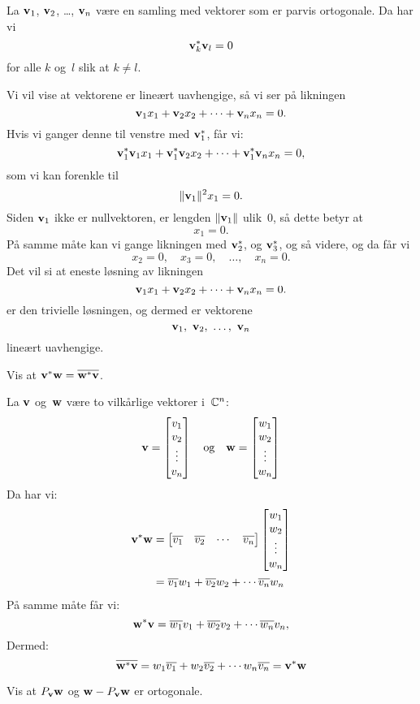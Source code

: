 \begin{losning}
La $\mathbf{v}_1$, $\mathbf{v}_2$, \ldots, $\mathbf{v}_n$ være en samling med vektorer som er
parvis ortogonale.  Da har vi
\[
\mathbf{v}_k^* \mathbf{v}_l = 0
\]
for alle $k$ og~$l$ slik at $k \ne l$.

Vi vil vise at vektorene er lineært uavhengige, så vi ser på likningen
\[
\mathbf{v}_1 x_1 + \mathbf{v}_2 x_2 + \cdots + \mathbf{v}_n x_n = 0.
\]
Hvis vi ganger denne til venstre med $\mathbf{v}_1^*$, får vi:
\[
\mathbf{v}_1^* \mathbf{v}_1 x_1 + \mathbf{v}_1^* \mathbf{v}_2 x_2 + \cdots + \mathbf{v}_1^* \mathbf{v}_n x_n = 0,
\]
som vi kan forenkle til
\[
\|\mathbf{v}_1\|^2 x_1 = 0.
\]
Siden $\mathbf{v}_1$ ikke er nullvektoren, er lengden $\|\mathbf{v}_1\|$ ulik~$0$, så
dette betyr at
\[
x_1 = 0.
\]
På samme måte kan vi gange likningen med $\mathbf{v}_2^*$, og $\mathbf{v}_3^*$, og så
videre, og da får vi
\[
x_2 = 0,\quad
x_3 = 0,\quad\ldots,\quad
x_n = 0.
\]
Det vil si at eneste løsning av likningen
\[
\mathbf{v}_1 x_1 + \mathbf{v}_2 x_2 + \cdots + \mathbf{v}_n x_n = 0.
\]
er den trivielle løsningen, og dermed er vektorene
\[
\v_1,\ \v_2,\ \ldots,\ \v_n
\]
lineært uavhengige.
\end{losning}


\begin{oppgave}
Vis at $\mathbf{v}^* \mathbf{w}=\overline{\mathbf{w}^* \mathbf{v}}$.
\end{oppgave}


\begin{losning}
La $\mathbf{v}$ og~$\mathbf{w}$ være to vilkårlige vektorer i~$\mathbb{C}^n$:
\[
\mathbf{v} = \begin{bmatrix} v_1 \\ v_2 \\ \vdots \\ v_n \end{bmatrix}
\quad\text{og}\quad
\mathbf{w} = \begin{bmatrix} w_1 \\ w_2 \\ \vdots \\ w_n \end{bmatrix}
\]
Da har vi:
\begin{align*}
\mathbf{v}^* \mathbf{w}
&=
\begin{bmatrix} \overline{v_1} & \overline{v_2} & \cdots & \overline{v_n} \end{bmatrix}
\begin{bmatrix} w_1 \\ w_2 \\ \vdots \\ w_n \end{bmatrix}
\\
&=
\overline{v_1} w_1 + 
\overline{v_2} w_2 + 
\cdots
\overline{v_n} w_n
\end{align*}
På samme måte får vi:
\[
\mathbf{w}^* \mathbf{v} =
\overline{w_1} v_1 + 
\overline{w_2} v_2 + 
\cdots
\overline{w_n} v_n,
\]
Dermed:
\[
\overline{\mathbf{w}^* \mathbf{v}} =
w_1 \overline{v_1} + 
w_2 \overline{v_2} + 
\cdots
w_n \overline{v_n}
= \mathbf{v}^* \mathbf{w}
\]
\end{losning}


\begin{oppgave}
Vis at $P_{\mathbf{v}}\mathbf{w}$ og $\mathbf{w}-P_{\mathbf{v}}\mathbf{w}$ er ortogonale.
\end{oppgave}


